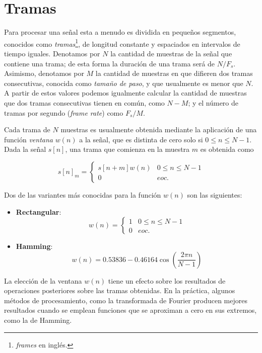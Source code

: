 \section{Tramas}\label{sec:frames}

Para procesar una señal esta a menudo es dividida en pequeños segmentos, conocidos como \textit{tramas}\footnote{\textit{frames} en inglés.}, de longitud constante y espaciados en intervalos de tiempo iguales.
Denotamos por $N$ la cantidad de muestras de la señal que contiene una trama;
de esta forma la duración de una trama será de $N/F_s$.
Asimismo, denotamos por $M$ la cantidad de muestras en que difieren dos tramas consecutivas, conocida como \textit{tamaño de paso}, y que usualmente es menor que $N$.
A partir de estos valores podemos igualmente calcular la cantidad de muestras que dos tramas consecutivas tienen en común, como $N-M$;
y el número de tramas por segundo (\textit{frame rate}) como $F_s/M$.

Cada trama de $N$ muestras es usualmente obtenida mediante la aplicación de una función \textit{ventana} $w(n)$ a la señal, que es distinta de cero solo si $0\leq n\leq N-1$.
Dada la señal $s[n]$, una trama que comienza en la muestra $m$ es obtenida como

\begin{equation}
    \label{eq:windowing}
    s[n]_m = \begin{cases}
                 s[n + m]w(n) & 0\leq n\leq N-1 \\
                 0 & eoc.
    \end{cases}
\end{equation}

Dos de las variantes más conocidas para la función $w(n)$ son las siguientes:

\begin{itemize}
    \item \textbf{Rectangular}:
    \[
        w(n) = \begin{cases}
                   1 & 0\leq n\leq N-1 \\
                   0 & eoc.
        \end{cases}
    \]
    \item \textbf{Hamming}:
    \[
        w(n) = 0.53836 - 0.46164 \cos\left(\frac{2\pi n}{N-1}\right)
    \]
\end{itemize}

La elección de la ventana $w(n)$ tiene un efecto sobre los resultados de operaciones posteriores sobre las tramas obtenidas.
En la práctica, algunos métodos de procesamiento, como la transformada de Fourier producen mejores resultados cuando se emplean funciones que se aproximan a cero en sus extremos, como la de Hamming.

